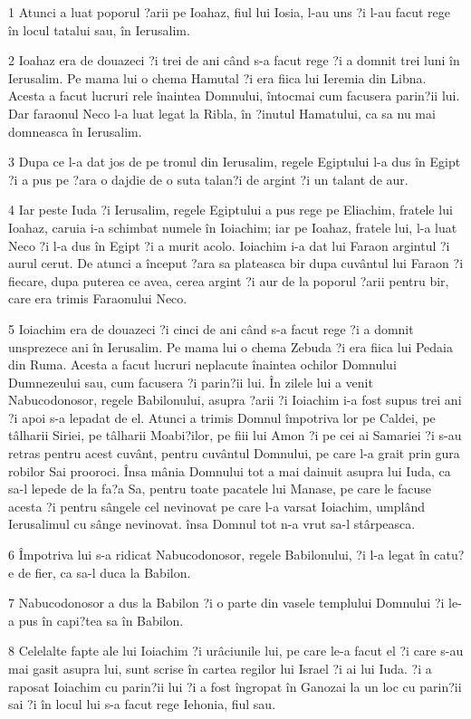 \par 1 Atunci a luat poporul ?arii pe Ioahaz, fiul lui Iosia, l-au uns ?i l-au facut rege în locul tatalui sau, în Ierusalim.
\par 2 Ioahaz era de douazeci ?i trei de ani când s-a facut rege ?i a domnit trei luni în Ierusalim. Pe mama lui o chema Hamutal ?i era fiica lui Ieremia din Libna. Acesta a facut lucruri rele înaintea Domnului, întocmai cum facusera parin?ii lui. Dar faraonul Neco l-a luat legat la Ribla, în ?inutul Hamatului, ca sa nu mai domneasca în Ierusalim.
\par 3 Dupa ce l-a dat jos de pe tronul din Ierusalim, regele Egiptului l-a dus în Egipt ?i a pus pe ?ara o dajdie de o suta talan?i de argint ?i un talant de aur.
\par 4 Iar peste Iuda ?i Ierusalim, regele Egiptului a pus rege pe Eliachim, fratele lui Ioahaz, caruia i-a schimbat numele în Ioiachim; iar pe Ioahaz, fratele lui, l-a luat Neco ?i l-a dus în Egipt ?i a murit acolo. Ioiachim i-a dat lui Faraon argintul ?i aurul cerut. De atunci a început ?ara sa plateasca bir dupa cuvântul lui Faraon ?i fiecare, dupa puterea ce avea, cerea argint ?i aur de la poporul ?arii pentru bir, care era trimis Faraonului Neco.
\par 5 Ioiachim era de douazeci ?i cinci de ani când s-a facut rege ?i a domnit unsprezece ani în Ierusalim. Pe mama lui o chema Zebuda ?i era fiica lui Pedaia din Ruma. Acesta a facut lucruri neplacute înaintea ochilor Domnului Dumnezeului sau, cum facusera ?i parin?ii lui. În zilele lui a venit Nabucodonosor, regele Babilonului, asupra ?arii ?i Ioiachim i-a fost supus trei ani ?i apoi s-a lepadat de el. Atunci a trimis Domnul împotriva lor pe Caldei, pe tâlharii Siriei, pe tâlharii Moabi?ilor, pe fiii lui Amon ?i pe cei ai Samariei ?i s-au retras pentru acest cuvânt, pentru cuvântul Domnului, pe care l-a grait prin gura robilor Sai prooroci. Însa mânia Domnului tot a mai dainuit asupra lui Iuda, ca sa-l lepede de la fa?a Sa, pentru toate pacatele lui Manase, pe care le facuse acesta ?i pentru sângele cel nevinovat pe care l-a varsat Ioiachim, umplând Ierusalimul cu sânge nevinovat. însa Domnul tot n-a vrut sa-l stârpeasca.
\par 6 Împotriva lui s-a ridicat Nabucodonosor, regele Babilonului, ?i l-a legat în catu?e de fier, ca sa-l duca la Babilon.
\par 7 Nabucodonosor a dus la Babilon ?i o parte din vasele templului Domnului ?i le-a pus în capi?tea sa în Babilon.
\par 8 Celelalte fapte ale lui Ioiachim ?i urâciunile lui, pe care le-a facut el ?i care s-au mai gasit asupra lui, sunt scrise în cartea regilor lui Israel ?i ai lui Iuda. ?i a raposat Ioiachim cu parin?ii lui ?i a fost îngropat în Ganozai la un loc cu parin?ii sai ?i în locul lui s-a facut rege Iehonia, fiul sau.
